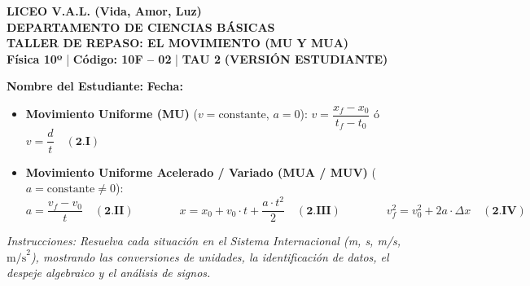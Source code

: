 \documentclass[11pt, letterpaper]{article}
\newif\ifmostrarrespuestas
\begin{document}
	
	\begin{center}
		{\Large \textbf{\color{valblue} LICEO V.A.L. (Vida, Amor, Luz)}}\\[0.1cm]
		{\large \textbf{DEPARTAMENTO DE CIENCIAS BÁSICAS}}\\[0.1cm]
		{\large \textbf{TALLER DE REPASO: EL MOVIMIENTO (MU Y MUA)}}\\[0.1cm]
		{\small \textbf{Física 10º} \quad | \quad \textbf{Código: 10F -- 02} \quad | \quad \textbf{TAU 2} \quad 
			\ifmostrarrespuestas \textcolor{valblue}{\textbf{(VERSIÓN PROFESOR)}} \else \textbf{(VERSIÓN ESTUDIANTE)} \fi}
	\end{center}
	
	\vspace{0.2cm}
	\noindent \textbf{Nombre del Estudiante:} \underline{\hspace{8.2cm}} \hfill \textbf{Fecha:} \underline{\hspace{3cm}}
	\vspace{0.3cm}
	
	\begin{tcolorbox}[colback=valgray, colframe=valdark, arc=1mm, boxrule=0.8pt, title=\textbf{Modelos Matemáticos del TAU 2 (10F--02)}]
		\small
		\begin{itemize}[leftmargin=*, itemsep=0.1cm, topsep=0pt]
			\item \textbf{Movimiento Uniforme (MU)} ($v = \text{constante}$, $a = 0$): 
			\quad $v = \dfrac{x_f - x_0}{t_f - t_0}$ \quad ó \quad $v = \dfrac{d}{t} \quad \mathbf{(2.I)}$
			\item \textbf{Movimiento Uniforme Acelerado / Variado (MUA / MUV)} ($a = \text{constante} \neq 0$):
			$$a = \frac{v_f - v_0}{t} \quad \mathbf{(2.II)} \qquad\qquad x = x_0 + v_0 \cdot t + \frac{a \cdot t^2}{2} \quad \mathbf{(2.III)} \qquad\qquad v_f^2 = v_0^2 + 2a \cdot \Delta x \quad \mathbf{(2.IV)}$$
		\end{itemize}
		\textit{Instrucciones: Resuelva cada situación en el Sistema Internacional (m, s, m/s, $\text{m/s}^2$), mostrando las conversiones de unidades, la identificación de datos, el despeje algebraico y el análisis de signos.}
	\end{tcolorbox}
	
	\vspace{0.3cm}
	
\end{document}
